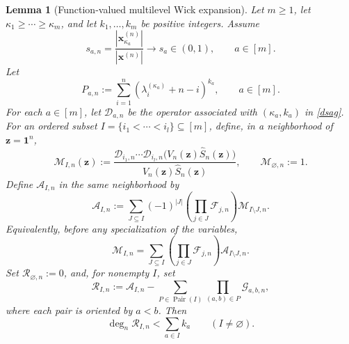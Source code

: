\documentclass[11pt]{amsart}
\theoremstyle{plain}
\newtheorem{lemma}[theorem]{Lemma}
\renewcommand\ell{l}
\numberwithin{equation}{section}
\numberwithin{theorem}{section}
\numberwithin{figure}{section}
\begin{document}
\begin{lemma}[Function-valued multilevel Wick expansion]\label{le47}
Let \(m\geq1\), let \(\kappa_1\geq\cdots\geq\kappa_m\), and let
\(k_1,\ldots,k_m\) be positive integers.  Assume
\[
    s_{a,n}
    =
    \frac{|\mathbf x^{(n)}_{\kappa_a}|}{|\mathbf x^{(n)}|}
    \longrightarrow s_a\in(0,1),
    \qquad a\in[m].
\]
Let
\begin{equation}
    P_{a,n}
    :=
    \sum_{i=1}^{n}
    \left(\lambda_i^{(\kappa_a)}+n-i\right)^{k_a},
    \qquad a\in[m].
    \label{eq:abstract-level-power-sum}
\end{equation}
For each \(a\in[m]\), let \(\mathscr D_{a,n}\) be the operator
associated with \((\kappa_a,k_a)\) in
\eqref{dsag}.
For an ordered subset \(I=\{i_1<\cdots<i_\ell\}\subseteq[m]\), define, in a neighborhood of \(\mathbf z=\mathbf1^n\),
\begin{equation}
    \mathcal M_{I,n}(\mathbf z)
    :=
    \frac{
        \mathscr D_{i_1,n}\cdots\mathscr D_{i_\ell,n}
        \bigl(V_n(\mathbf z)\widehat S_n(\mathbf z)\bigr)
    }{
        V_n(\mathbf z)\widehat S_n(\mathbf z)
    },
    \qquad
    \mathcal M_{\varnothing,n}:=1.
    \label{eq:function-valued-moment}
\end{equation}
Define \(\mathcal A_{I,n}\) in the same neighborhood by
\begin{equation}
    \mathcal A_{I,n}
    :=
    \sum_{J\subseteq I}
    (-1)^{|J|}
    \left(\prod_{j\in J}\mathcal F_{j,n}\right)
    \mathcal M_{I\setminus J,n}.
    \label{eq:connected-germ-definition}
\end{equation}
Equivalently, before any specialization of the variables,
\begin{equation}
    \mathcal M_{I,n}
    =
    \sum_{J\subseteq I}
    \left(\prod_{j\in J}\mathcal F_{j,n}\right)
    \mathcal A_{I\setminus J,n}.
    \label{eq:function-valued-singleton-expansion}
\end{equation}
Set \(\mathcal R_{\varnothing,n}:=0\), and, for nonempty \(I\), set
\begin{equation}
    \mathcal R_{I,n}
    :=
    \mathcal A_{I,n}
    -
    \sum_{P\in\operatorname{Pair}(I)}
    \prod_{(a,b)\in P}\mathcal G_{a,b,n},
    \label{eq:function-valued-wick}
\end{equation}
where each pair is oriented by \(a<b\).  Then
\begin{equation}
    \deg_n\mathcal R_{I,n}
    <
    \sum_{a\in I}k_a
    \qquad(I\ne\varnothing).
    \label{eq:wick-remainder-all-jets}
\end{equation}

\end{lemma}
\end{document}
